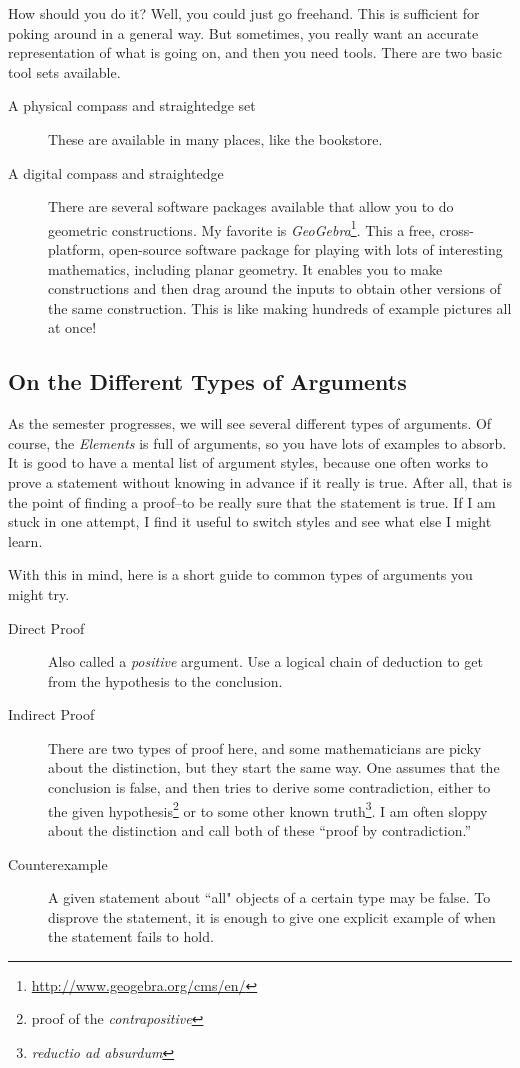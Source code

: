\documentclass{tufte-handout}
\theoremstyle{definition}
\begin{document}
How should you do it? 
Well, you could just go freehand. 
This is sufficient for poking around in a general way. 
But sometimes, you really want an accurate representation of what is going on, and then you need tools. 
There are two basic tool sets available. 
\begin{description}
\item[A physical compass and straightedge set] These are available in many places, like the bookstore.
\item[A digital compass and straightedge] There are several software packages available that allow you to do geometric constructions. 
My favorite is \emph{GeoGebra}\footnote{\url{http://www.geogebra.org/cms/en/}}.
This a free, cross-platform, open-source software package for playing with lots of interesting mathematics, including planar geometry.
It enables you to make constructions and then drag around the inputs to obtain other versions of the same construction. 
This is like making hundreds of example pictures all at once!
\end{description}

\subsection*{On the Different Types of Arguments}
As the semester progresses, we will see several different types of arguments.
Of course, the \emph{Elements} is full of arguments, so you have lots of examples to absorb.
It is good to have a mental list of argument styles, because one often works to prove a statement without knowing in advance if it really is true.
After all, that is the point of finding a proof--to be really sure that the statement is true. 
If I am stuck in one attempt, I find it useful to switch styles and see what else I might learn.

With this in mind, here is a short guide to common types of arguments you might try.

\begin{description}
\item[Direct Proof] Also called a \emph{positive} argument.
Use a logical chain of deduction to get from the hypothesis to the conclusion.

\item[Indirect Proof] There are two types of proof here, and some mathematicians are picky about the distinction, but they start the same way.
One assumes that the conclusion is false, and then tries to derive some contradiction, either to the given hypothesis\footnote{proof of the \emph{contrapositive}} or to some other known truth\footnote{\emph{reductio ad absurdum}}.
I am often sloppy about the distinction and call both of these ``proof by contradiction.''

\item[Counterexample] A given statement about ``all" objects of a certain type may be false. To disprove the statement, it is enough to give one explicit example of when the statement fails to hold.
\end{description}
\end{document}
